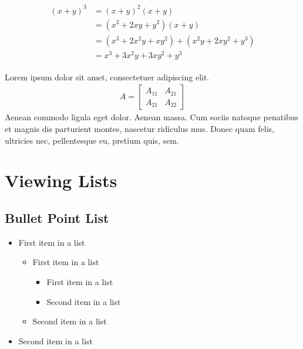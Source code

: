 \documentclass[11pt]{scrartcl} %
\begin{document}
\begin{align} 
	\begin{split}
		(x+y)^3 &= (x+y)^2(x+y)\\
		&=(x^2+2xy+y^2)(x+y)\\
		&=(x^3+2x^2y+xy^2) + (x^2y+2xy^2+y^3)\\
		&=x^3+3x^2y+3xy^2+y^3
	\end{split}					
\end{align}

Lorem ipsum dolor sit amet, consectetuer adipiscing elit. 
\begin{align}
	A = 
	\begin{bmatrix}
		A_{11} & A_{21} \\
		A_{21} & A_{22}
	\end{bmatrix}
\end{align}
Aenean commodo ligula eget dolor. Aenean massa. Cum sociis natoque penatibus et magnis dis parturient montes, nascetur ridiculus mus. Donec quam felis, ultricies nec, pellentesque eu, pretium quis, sem.


\section{Viewing Lists}

\subsection{Bullet Point List}

\begin{itemize}
	\item First item in a list 
		\begin{itemize}
		\item First item in a list 
			\begin{itemize}
			\item First item in a list 
			\item Second item in a list 
			\end{itemize}
		\item Second item in a list 
		\end{itemize}
	\item Second item in a list 
\end{itemize}
\end{document}
